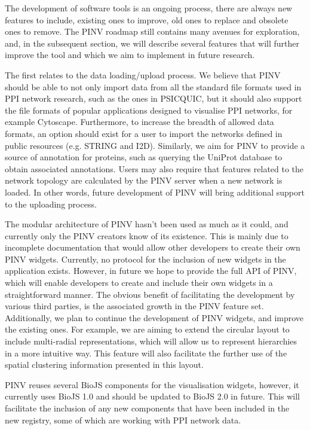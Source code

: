 The development of software tools is an ongoing process, there are always new features to include, existing ones to improve, old ones to replace and obsolete ones to remove. The PINV roadmap still contains many avenues for exploration, and, in the subsequent section, we will describe several features that will further improve the tool and which we aim to implement in future research.

The first relates to the data loading/upload process. We believe that PINV should be able to not only import data from all the standard file formats used in PPI network research, such as the ones in PSICQUIC, but it should also support the file formats of popular applications designed to visualise PPI networks, for example Cytoscape. Furthermore, to increase the breadth of allowed data formats, an option should exist for a user to import the networks defined in public resources (e.g. STRING and I2D). Similarly, we aim for PINV to provide a source of annotation for proteins, such as querying the UniProt database to obtain associated annotations. Users may also require that features related to the network topology are calculated by the PINV server when a new network is loaded. In other words, future development of PINV will bring additional support to the uploading process.

The modular architecture of PINV hasn't been used as much as it could, and currently only the PINV creators know of its existence. This is mainly due to incomplete documentation that would allow other developers to create their own PINV widgets. Currently, no protocol for the inclusion of new widgets in the application exists. However, in future we hope to provide the full API of PINV, which will enable developers to create and include their own widgets in a straightforward manner.  The obvious benefit of facilitating the development by various third parties, is the associated growth in the PINV feature set. Additionally, we plan to continue the development of PINV widgets, and improve the existing ones.  For example, we are aiming to extend the circular layout to include multi-radial representations, which will allow us to represent hierarchies in a more intuitive way. This feature will also facilitate the further use of the spatial clustering information presented in this layout.

PINV reuses several BioJS components for the visualisation widgets, however, it currently uses BioJS 1.0 and should be updated to BioJS 2.0 in future. This will facilitate the inclusion of any new components that have been included in the new registry, some of which are working with PPI network data.

